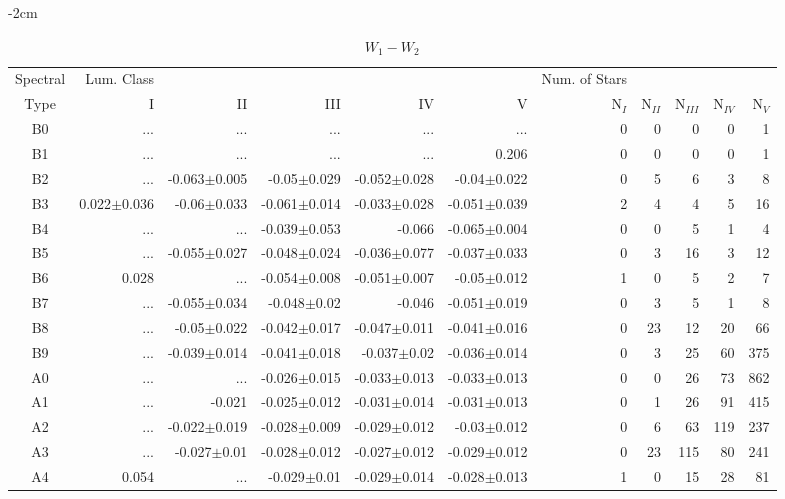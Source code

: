 \begin{table}[t]
\tiny
\centering
\caption{$W_{1}-W_{2}$}
\begin{center}
    \addtolength{\leftskip} {-2cm}
    \addtolength{\rightskip}{-2cm}
    \begin{tabular}{c|rrrrr|rrrrr}
    \toprule
    Spectral & Lum. Class & & & & & Num. of Stars & & & &  \\
    Type & I & II & III &  IV & V & N$_{I}$ & N$_{II}$ & N$_{III}$ & N$_{IV}$ & N$_{V}$ \\ \midrule
  
B0	&	 ...	&	 ...	&	 ...	&	 ...	&	 ...	&	0	&	0	&	0	&	0	&	1	\\
B1	&	 ...	&	 ...	&	 ...	&	 ...	&	0.206	&	0	&	0	&	0	&	0	&	1	\\
B2	&	 ...	&	-0.063$\pm$0.005	&	-0.05$\pm$0.029	&	-0.052$\pm$0.028	&	-0.04$\pm$0.022	&	0	&	5	&	6	&	3	&	8	\\
B3	&	0.022$\pm$0.036	&	-0.06$\pm$0.033	&	-0.061$\pm$0.014	&	-0.033$\pm$0.028	&	-0.051$\pm$0.039	&	2	&	4	&	4	&	5	&	16	\\
B4	&	 ...	&	 ...	&	-0.039$\pm$0.053	&	-0.066	&	-0.065$\pm$0.004	&	0	&	0	&	5	&	1	&	4	\\
B5	&	 ...	&	-0.055$\pm$0.027	&	-0.048$\pm$0.024	&	-0.036$\pm$0.077	&	-0.037$\pm$0.033	&	0	&	3	&	16	&	3	&	12	\\
B6	&	0.028	&	 ...	&	-0.054$\pm$0.008	&	-0.051$\pm$0.007	&	-0.05$\pm$0.012	&	1	&	0	&	5	&	2	&	7	\\
B7	&	 ...	&	-0.055$\pm$0.034	&	-0.048$\pm$0.02	&	-0.046	&	-0.051$\pm$0.019	&	0	&	3	&	5	&	1	&	8	\\
B8	&	 ...	&	-0.05$\pm$0.022	&	-0.042$\pm$0.017	&	-0.047$\pm$0.011	&	-0.041$\pm$0.016	&	0	&	23	&	12	&	20	&	66	\\
B9	&	 ...	&	-0.039$\pm$0.014	&	-0.041$\pm$0.018	&	-0.037$\pm$0.02	&	-0.036$\pm$0.014	&	0	&	3	&	25	&	60	&	375	\\
A0	&	 ...	&	 ...	&	-0.026$\pm$0.015	&	-0.033$\pm$0.013	&	-0.033$\pm$0.013	&	0	&	0	&	26	&	73	&	862	\\
A1	&	 ...	&	-0.021	&	-0.025$\pm$0.012	&	-0.031$\pm$0.014	&	-0.031$\pm$0.013	&	0	&	1	&	26	&	91	&	415	\\
A2	&	 ...	&	-0.022$\pm$0.019	&	-0.028$\pm$0.009	&	-0.029$\pm$0.012	&	-0.03$\pm$0.012	&	0	&	6	&	63	&	119	&	237	\\
A3	&	 ...	&	-0.027$\pm$0.01	&	-0.028$\pm$0.012	&	-0.027$\pm$0.012	&	-0.029$\pm$0.012	&	0	&	23	&	115	&	80	&	241	\\
A4	&	0.054	&	 ...	&	-0.029$\pm$0.01	&	-0.029$\pm$0.014	&	-0.028$\pm$0.013	&	1	&	0	&	15	&	28	&	81	\\

\end{tabular}
\end{center}
\end{table}
